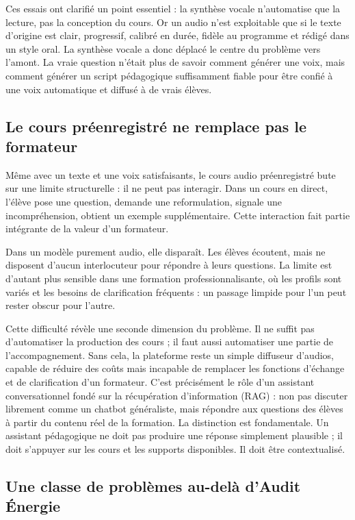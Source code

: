 \documentclass[12pt,a4paper]{article}
\begin{document}
Ces essais ont clarifié un point essentiel : la synthèse vocale n'automatise que la lecture,
pas la conception du cours. Or un audio n'est exploitable que si le texte d'origine est clair,
progressif, calibré en durée, fidèle au programme et rédigé dans un style oral. La synthèse
vocale a donc déplacé le centre du problème vers l'amont. La vraie question n'était plus de
savoir comment générer une voix, mais comment générer un script pédagogique
suffisamment fiable pour être confié à une voix automatique et diffusé à de vrais élèves.

\subsection{Le cours préenregistré ne remplace pas le formateur}

Même avec un texte et une voix satisfaisants, le cours audio préenregistré bute sur une
limite structurelle : il ne peut pas interagir. Dans un cours en direct, l'élève pose une
question, demande une reformulation, signale une incompréhension, obtient un exemple
supplémentaire. Cette interaction fait partie intégrante de la valeur d'un formateur.

Dans un modèle purement audio, elle disparaît. Les élèves écoutent, mais ne disposent
d'aucun interlocuteur pour répondre à leurs questions. La limite est d'autant plus sensible
dans une formation professionnalisante, où les profils sont variés et les besoins de
clarification fréquents : un passage limpide pour l'un peut rester obscur pour l'autre.

Cette difficulté révèle une seconde dimension du problème. Il ne suffit pas d'automatiser
la production des cours ; il faut aussi automatiser une partie de l'accompagnement. Sans
cela, la plateforme reste un simple diffuseur d'audios, capable de réduire des coûts mais
incapable de remplacer les fonctions d'échange et de clarification d'un formateur. C'est
précisément le rôle d'un assistant conversationnel fondé sur la récupération d'information
(RAG) : non pas discuter librement comme un chatbot généraliste, mais répondre aux
questions des élèves à partir du contenu réel de la formation. La distinction est
fondamentale. Un assistant pédagogique ne doit pas produire une réponse simplement
plausible ; il doit s'appuyer sur les cours et les supports disponibles. Il doit être
contextualisé.

\subsection{Une classe de problèmes au-delà d'Audit Énergie}
\end{document}
